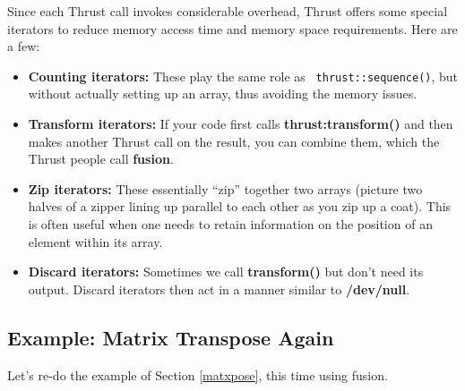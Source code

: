 Since each Thrust call invokes considerable overhead, Thrust offers some
special iterators to reduce memory access time and memory space
requirements.  Here are a few:

\begin{itemize}

\item {\bf Counting iterators:}  These play the same role as {\tt
thrust::sequence()}, but without actually setting up an array, thus
avoiding the memory issues.

\item {\bf Transform iterators:}  If your code first calls {\bf
thrust:transform()} and then makes another Thrust call on the result,
you can combine them, which the Thrust people call {\bf fusion}.

\item {\bf Zip iterators:} These essentially ``zip'' together two arrays
(picture two halves of a zipper lining up parallel to each other as you
zip up a coat).  This is often useful when one needs to retain
information on the position of an element within its array.

\item {\bf Discard iterators:}  Sometimes we call {\bf transform()} but
don't need its output.  Discard iterators then act in a manner similar
to {\bf /dev/null}.

\end{itemize}

\subsection{Example:  Matrix Transpose Again}

Let's re-do the example of Section \ref{matxpose}, this time using
fusion.  

